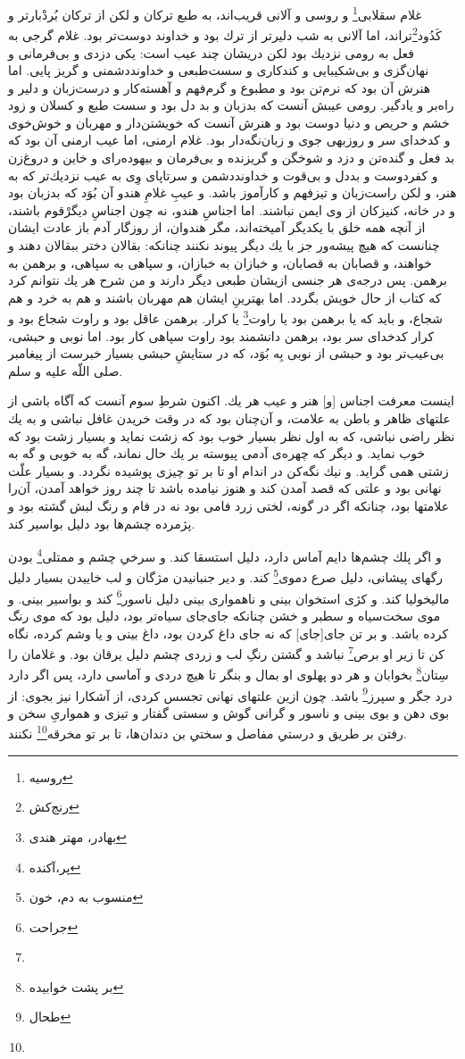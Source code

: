 غلام سقلابى\footnote{روسیه} و روسى و آلانى قريب‌اند، به طبع تركان و لكن از تركان بُردْبارتر و كَدُود\footnote{رنج‌کش}تراند، اما آلانى به شب دليرتر از ترك بود و خداوند دوست‌تر بود. غلام گرجى به فعل به رومى نزديك بود لكن دريشان چند عيب است: يكى دزدى و بى‌فرمانى و نهان‌گزى و بى‌شكيبايى و كندكارى و سست‌طبعى و خداوند‌دشمنى و گريز پايى. اما هنرش آن بود كه نرم‌تن بود و مطبوع و گرم‌فهم و آهسته‌كار و درست‌زبان و دلير و راه‌بر و ياد‌گير. رومى عيبش آنست كه بد‌زبان و بد دل بود و سست طبع و كسلان و زود خشم و حريص و دنيا دوست بود و هنرش آنست كه خويشتن‌دار و مهربان و خوش‌خوى و كدخداى سر و روزبهى جوى و زبان‌نگه‌دار بود. غلام ارمنى، اما عيب ارمنى آن بود كه بد فعل و گنده‌تن و دزد و شوخگن و گريزنده و بى‌فرمان و بيهوده‌راى و خاين و دروغ‌زن و كفر‌دوست و بد‌دل و بى‌قوت و خداوند‌دشمن و سر‌تا‌پاى وِى به عيب نزديك‌تر كه به هنر، و لكن راست‌زبان و تيز‌فهم و كارآموز باشد. و عيبِ غلامِ هندو آن بُوَد كه بد‌زبان بود و در خانه، كنيزكان از وى ايمن نباشند. اما اجناسِ هندو، نه چون اجناسِ ديگر‌ْقوم باشند، از آنچه همه خلق با يكديگر آميخته‌اند، مگر هندوان، از روزگار آدم باز عادت ايشان چنانست كه هيچ پيشه‌ور جز با يك ديگر پيوند نكنند چنانكه: بقالان دختر ببقالان دهند و خواهند، و قصابان به قصابان، و خبازان به خبازان، و سپاهى به سپاهى، و برهمن به برهمن. پس درجه‌ی هر جنسى ازيشان طبعى ديگر دارند و من شرح هر يك نتوانم كرد كه كتاب از حال خويش بگردد. اما بهترينِ ايشان هم مهربان باشند و هم به خرد و هم شجاع، و بايد كه يا برهمن بود يا راوت\footnote{بهادر، مهتر هندی} يا كرار. برهمن عاقل بود و راوت شجاع بود و كرار كدخداى سر بود، برهمن دانشمند بود راوت سپاهى كار بود. اما نوبى و حبشى، بى‌عيب‌تر بود و حبشى از نوبى بِه بُوَد، كه در ستايشِ حبشى بسيار خبرست از پيغامبر صلى اللّه عليه و سلم.

اينست معرفت اجناس [و] هنر و عيب هر يك. اكنون شرطِ سوم آنست كه آگاه باشى از علتهاى ظاهر و باطن به علامت، و آن‌چنان بود كه در وقت خريدن غافل نباشى و به يك نظر راضى نباشى، كه به اول نظر بسيار خوب بود كه زشت نمايد و بسيار زشت بود كه خوب نمايد. و ديگر كه چهره‌ی آدمى پيوسته بر يك حال نماند، گه به خوبى و گه به زشتى همى گرايد. و نيك نگه‌كن در اندام او تا بر تو چيزى پوشيده نگردد. و بسيار علّت نهانى بود و علتى كه قصد آمدن كند و هنوز نيامده باشد تا چند روز خواهد آمدن، آن‌را علامتها بود، چنانكه اگر در گونه، لختى زرد‌ فامى بود نه در فام و رنگ لبش گشته بود و پژمرده چشم‌ها بود دليل بواسير كند.

و اگر پلك چشم‌ها دايم آماس دارد، دليل استسقا كند. و سرخىِ چشم و ممتلى\footnote{پر،‌آکنده} بودن رگهاى پيشانى، دليل صرع دموى\footnote{منسوب به دم، خون} كند. و دير جنبانيدن مژگان و لب خاييدن بسيار دليل ماليخوليا كند. و كژى استخوان بينى و ناهموارى بينى دليل ناسور\footnote{جراحت} كند و بواسير بينى. و موى سخت‌‌سياه و سطبر و خشن چنانكه جاى‌جاى سياه‌تر بود، دليل بود كه موى رنگ كرده باشد. و بر تن جاى‌[جاى] كه نه جاى داغ كردن بود، داغ بينى و يا وشم كرده، نگاه كن تا زير او برص\footnote{} نباشد و گشتن رنگِ لب و زردى چشم دليل يرقان بود. و غلامان را سِتان\footnote{بر پشت خوابیده} بخوابان و هر دو پهلوى او بمال و بنگر تا هيچ دردى و آماسى دارد، پس اگر دارد درد جگر و سپرز\footnote{طحال} باشد. چون ازين علتهاى نهانى تجسس كردى، از آشكارا نيز بجوى: از بوى دهن و بوى بينى و ناسور و گرانى گوش و سستى گفتار و تيزى و هموارىِ سخن و رفتن بر طريق و درستىِ مفاصل و سختىِ بن دندان‌ها، تا بر تو مخرقه\footnote{} نكنند.

